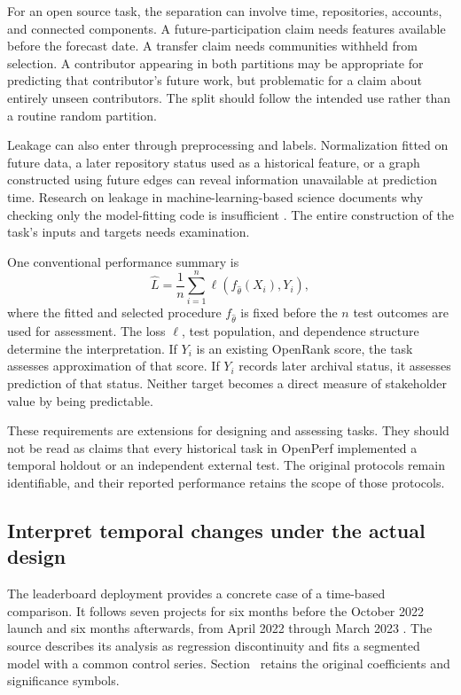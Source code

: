 For an open source task, the separation can involve time, repositories, accounts, and connected components. A future-participation claim needs features available before the forecast date. A transfer claim needs communities withheld from selection. A contributor appearing in both partitions may be appropriate for predicting that contributor's future work, but problematic for a claim about entirely unseen contributors. The split should follow the intended use rather than a routine random partition.

Leakage can also enter through preprocessing and labels. Normalization fitted on future data, a later repository status used as a historical feature, or a graph constructed using future edges can reveal information unavailable at prediction time. Research on leakage in machine-learning-based science documents why checking only the model-fitting code is insufficient \citep{kapoor2023}. The entire construction of the task's inputs and targets needs examination.

One conventional performance summary is
\begin{equation}
\widehat L=\frac{1}{n}\sum_{i=1}^{n}
 \ell\!\left(f_{\widehat\theta}(X_i),Y_i\right),
\label{eq:ch3-prediction}
\end{equation}
where the fitted and selected procedure \(f_{\widehat\theta}\) is fixed before the \(n\) test outcomes are used for assessment. The loss \(\ell\), test population, and dependence structure determine the interpretation. If \(Y_i\) is an existing OpenRank score, the task assesses approximation of that score. If \(Y_i\) records later archival status, it assesses prediction of that status. Neither target becomes a direct measure of stakeholder value by being predictable.

These requirements are extensions for designing and assessing tasks. They should not be read as claims that every historical task in OpenPerf implemented a temporal holdout or an independent external test. The original protocols remain identifiable, and their reported performance retains the scope of those protocols.

\subsection{Interpret temporal changes under the actual design}
The leaderboard deployment provides a concrete case of a time-based comparison. It follows seven projects for six months before the October 2022 launch and six months afterwards, from April 2022 through March 2023 \citep{zhao2024}. The source describes its analysis as regression discontinuity and fits a segmented model with a common control series. Section~ retains the original coefficients and significance symbols.

